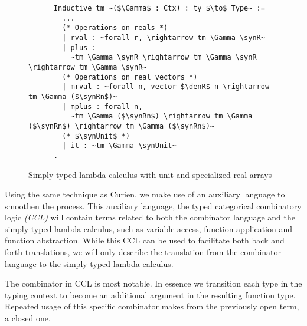   \begin{figure}
    \centering
    \begin{verbatim}
      Inductive tm ~($\Gamma$ : Ctx) : ty $\to$ Type~ :=
        ...
        (* Operations on reals *)
        | rval : ~forall r, \rightarrow tm \Gamma \synR~
        | plus :
          ~tm \Gamma \synR \rightarrow tm \Gamma \synR \rightarrow tm \Gamma \synR~
        (* Operations on real vectors *)
        | mrval : ~forall n, vector $\denR$ n \rightarrow tm \Gamma ($\synRn$)~
        | mplus : forall n,
          ~tm \Gamma ($\synRn$) \rightarrow tm \Gamma ($\synRn$) \rightarrow tm \Gamma ($\synRn$)~
        (* $\synUnit$ *)
        | it : ~tm \Gamma \synUnit~
      .
    \end{verbatim}
    \caption{Simply-typed lambda calculus with unit and specialized real arrays}
    \label{fig:stlc_combinator}
  \end{figure}

  Using the same technique as Curien\cite{10.1007/3-540-15198-2_10}, we make use of an auxiliary language to smoothen the process.
  This auxiliary language, the typed categorical combinatory logic \textit{(CCL)} will contain terms related to both the combinator language and the simply-typed lambda calculus, such as variable access, function application and function abstraction.
  While this CCL can be used to facilitate both back and forth translations, we will only describe the translation from the combinator language to the simply-typed lambda calculus.

  The \cclenv combinator in CCL is most notable.
  In essence we transition each type in the typing context to become an additional argument in the resulting function type.
  Repeated usage of this specific combinator makes from the previously open term, a closed one.

